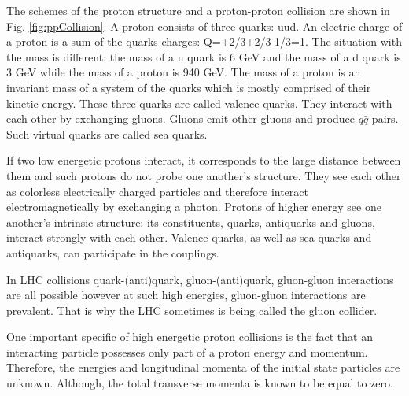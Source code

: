 The schemes of the proton structure and a proton-proton collision are shown in Fig. \ref{fig:ppCollision}. A proton consists of three quarks: uud. An electric charge of a proton is a sum of the quarks charges: Q=+2/3+2/3-1/3=1. The situation with the mass is different: the mass of a u quark is 6 GeV and the mass of a d quark is 3 GeV while the mass of a proton is 940 GeV. The mass of a proton is an invariant mass of a system of the quarks which is mostly comprised of their kinetic energy. These three quarks are called valence quarks. They interact with each other by exchanging gluons. Gluons emit other gluons and produce $q\bar{q}$ pairs. Such virtual quarks are called sea quarks.

If two low energetic protons interact, it corresponds to the large distance between them and such protons do not probe one another's structure. They see each other as colorless electrically charged particles and therefore interact electromagnetically by exchanging a photon. Protons of higher energy see one another's intrinsic structure: its constituents, quarks, antiquarks and gluons, interact strongly with each other. Valence quarks, as well as sea quarks and antiquarks, can participate in the couplings.

In LHC collisions quark-(anti)quark, gluon-(anti)quark, gluon-gluon interactions are all possible however at such high energies, gluon-gluon interactions are prevalent. That is why the LHC sometimes is being called the gluon collider.

One important specific of high energetic proton collisions is the fact that an interacting particle possesses only part of a proton energy and momentum. Therefore, the energies and longitudinal momenta of the initial state particles are unknown. Although, the total transverse momenta is known to be equal to zero.  
